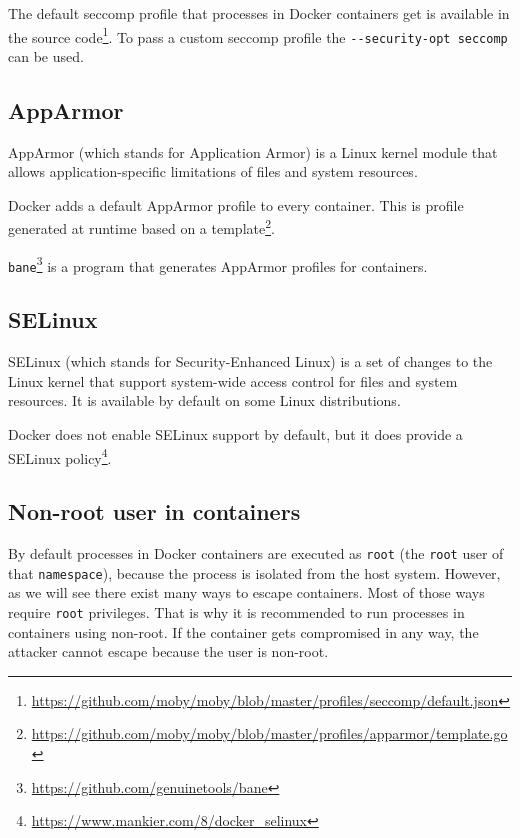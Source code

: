 \hfill

The default seccomp profile that processes in Docker containers get is available in the source code\footnote{\url{https://github.com/moby/moby/blob/master/profiles/seccomp/default.json}}. To pass a custom seccomp profile the \lstinline{--security-opt seccomp} can be used.


\subsection{AppArmor}
AppArmor (which stands for Application Armor) is a Linux kernel module that allows application-specific limitations of files and system resources.

\hfill

Docker adds a default AppArmor profile to every container. This is profile generated at runtime based on a template\footnote{\url{https://github.com/moby/moby/blob/master/profiles/apparmor/template.go}}.

\hfill

\lstinline{bane}\footnote{\url{https://github.com/genuinetools/bane}} is a program that generates AppArmor profiles for containers.

\subsection{SELinux}
SELinux (which stands for Security-Enhanced Linux) is a set of changes to the Linux kernel that support system-wide access control for files and system resources. It is available by default on some Linux distributions.

\hfill

Docker does not enable SELinux support by default, but it does provide a SELinux policy\footnote{\url{https://www.mankier.com/8/docker_selinux}}.

\subsection{Non-root user in containers}
By default processes in Docker containers are executed as \lstinline{root} (the \lstinline{root} user of that \lstinline{namespace}), because the process is isolated from the host system. However, as we will see there exist many ways to escape containers. Most of those ways require \lstinline{root} privileges. That is why it is recommended to run processes in containers using non-root. If the container gets compromised in any way, the attacker cannot escape because the user is non-root.
